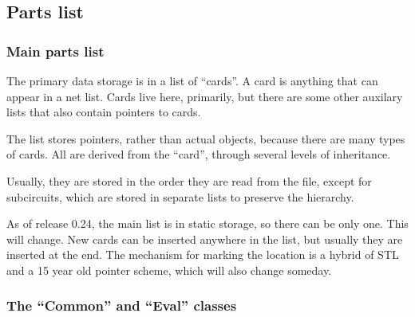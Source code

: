 %
%
%
%
\subsection{Parts list}
\subsubsection{Main parts list}

The primary data storage is in a list of ``cards''.  A card is
anything that can appear in a net list.  Cards live here, primarily,
but there are some other auxilary lists that also contain pointers to
cards.

The list stores pointers, rather than actual objects, because there
are many types of cards.  All are derived from the ``card'', through
several levels of inheritance.

Usually, they are stored in the order they are read from the file,
except for subcircuits, which are stored in separate lists to preserve 
the hierarchy.

As of release 0.24, the main list is in static storage, so there can
be only one.  This will change.  New cards can be inserted anywhere in 
the list, but usually they are inserted at the end.  The mechanism for 
marking the location is a hybrid of STL and a 15 year old pointer
scheme, which will also change someday.
\subsubsection{The ``Common'' and ``Eval'' classes}

